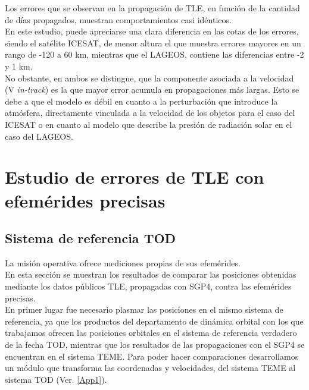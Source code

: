 Los errores que se observan en la propagaci\'on de TLE, en funci\'on de la cantidad de d\'ias propagados, muestran comportamientos casi id\'enticos.\\
En este estudio, puede apreciarse una clara diferencia en las cotas de los errores, siendo el sat\'elite ICESAT, de menor altura el que muestra errores mayores en un rango de -120 a 60 km, mientras que el LAGEOS, contiene las diferencias entre -2 y 1 km.\\
No obstante, en ambos se distingue, que la componente asociada a la velocidad (V {\it{in-track}}) es la que mayor error acumula en propagaciones m\'as largas. Esto se debe a que el modelo es d\'ebil en cuanto a la perturbaci\'on que introduce la atm\'osfera, directamente vinculada a la velocidad de los objetos para el caso del ICESAT o en cuanto al modelo que describe la presi\'on de radiaci\'on solar en el caso del LAGEOS.\\


\section{Estudio de errores de TLE con efem\'erides precisas}
\subsection*{Sistema de referencia TOD}
La misi\'on operativa ofrece mediciones propias de sus efem\'erides.\\
En esta secci\'on se muestran los resultados de comparar las posiciones obtenidas mediante los datos p\'ublicos TLE, propagadas con SGP4, contra las efem\'erides precisas.\\ 

En primer lugar fue necesario plasmar las posiciones en el mismo sistema de referencia, ya que los productos del departamento de din\'amica orbital con los que trabajamos ofrecen las posiciones orbitales en el sistema de referencia verdadero de la fecha \ac{TOD}, mientras que los resultados de las propagaciones con el SGP4 se encuentran en el sistema \ac{TEME}. Para poder hacer comparaciones desarrollamos un m\'odulo que transforma las coordenadas y velocidades, del sistema TEME al sistema TOD (Ver. \ref{App1}).\\


